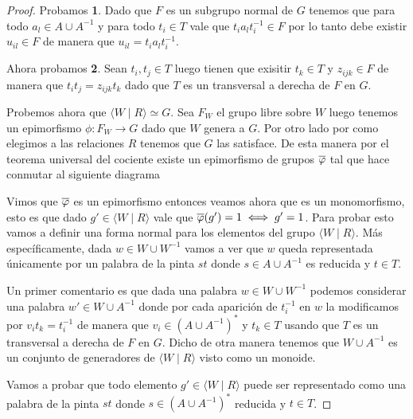 \documentclass[tesis.tex]{subfiles}
\begin{document}
	
	\begin{proof}
		Probamos \textbf{1}.
		Dado que $F$ es un subgrupo normal de $G$ tenemos que para todo $a_{l} \in A \cup A^{-1}$ y para todo $t_{i} \in T$ vale que $t_{i}a_{l}t_{i}^{-1} \in F$ por lo tanto debe existir $u_{il} \in F$ de manera que $u_{il} = t_{i}a_{l}t_{i}^{-1}$.

		Ahora probamos \textbf{2}.
		Sean $t_{i},t_{j} \in T$ luego tienen que exisitir $t_{k} \in T$ y $z_{ijk} \in F$ de manera que $t_{i}t_{j} = z_{ijk}t_{k}$ dado que $T$ es un transversal a derecha de $F$ en $G$.

		Probemos ahora que $\langle W \mid R \rangle \simeq G$.
		Sea $F_{W}$ el grupo libre sobre $W$ luego tenemos un epimorfismo $\phi:F_{W} \to G$ dado que $W$ genera a $G$.
		Por otro lado por como elegimos a las relaciones $R$ tenemos que $G$ las satisface.
		De esta manera por el teorema universal del cociente existe un epimorfismo de grupos $\overline \varphi$ tal que hace conmutar al siguiente diagrama	
		\begin{center}
		\end{center}
		
		Vimos que $\overline \varphi$ es un epimorfismo entonces veamos ahora que es un monomorfismo, esto es que dado $g' \in \langle W \mid R \rangle$ vale que $\overline{\varphi}(g') = 1 \iff g' = 1$.
		Para probar esto vamos a definir una forma normal para los elementos del grupo $\langle W \mid R \rangle$.
		Más específicamente, dada $w \in W \cup W^{-1}$ vamos a ver que $w$ queda representada únicamente por un palabra de la pinta $st$ donde $s \in A \cup A^{-1}$ es reducida y $t \in T$. 
		
		Un primer comentario es que dada una palabra $w \in W \cup W^{-1}$ podemos considerar una palabra $w' \in W \cup A^{-1}$ donde por cada aparición de $t_{i}^{-1}$ en $ w$ la modificamos por $v_{i}t_{k} = t_{i}^{-1}$ de manera que $v_{i} \in (A \cup A^{-1})^{*}$ y $t_{k} \in T$ usando que $T$ es un transversal a derecha de $F$ en $G$.
		Dicho de otra manera tenemos que $W \cup A^{-1}$ es un conjunto de generadores de $\langle W \mid R \rangle$ visto como un monoide.

		Vamos a probar que todo elemento $g' \in \langle W \mid R \rangle$ puede ser representado como una palabra de la pinta $st$ donde $s \in (A \cup A^{-1})^{*}$ reducida y $t \in T$.


\end{proof}
\end{document}
